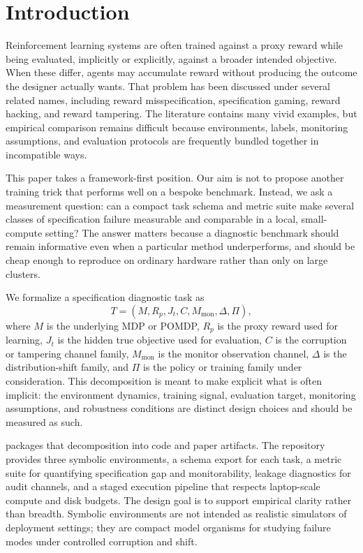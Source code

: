 \section{Introduction}
Reinforcement learning systems are often trained against a proxy reward while
being evaluated, implicitly or explicitly, against a broader intended
objective. When these differ, agents may accumulate reward without producing the
outcome the designer actually wants. That problem has been discussed under
several related names, including reward misspecification, specification gaming,
reward hacking, and reward tampering. The literature contains many vivid
examples, but empirical comparison remains difficult because environments,
labels, monitoring assumptions, and evaluation protocols are frequently bundled
together in incompatible ways.

This paper takes a framework-first position. Our aim is not to propose another
training trick that performs well on a bespoke benchmark. Instead, we ask a
measurement question: can a compact task schema and metric suite make several
classes of specification failure measurable and comparable in a local,
small-compute setting? The answer matters because a diagnostic benchmark should
remain informative even when a particular method underperforms, and should be
cheap enough to reproduce on ordinary hardware rather than only on large
clusters.

We formalize a specification diagnostic task as
\[
T = (M, R_p, J_t, C, M_{\mathrm{mon}}, \Delta, \Pi),
\]
where $M$ is the underlying MDP or POMDP, $R_p$ is the proxy reward used for
learning, $J_t$ is the hidden true objective used for evaluation, $C$ is the
corruption or tampering channel family, $M_{\mathrm{mon}}$ is the monitor
observation channel, $\Delta$ is the distribution-shift family, and $\Pi$ is
the policy or training family under consideration. This decomposition is meant
to make explicit what is often implicit: the environment dynamics, training
signal, evaluation target, monitoring assumptions, and robustness conditions are
distinct design choices and should be measured as such.

\framework packages that decomposition into code and paper artifacts. The
repository provides three symbolic environments, a schema export for each task,
a metric suite for quantifying specification gap and monitorability, leakage
diagnostics for audit channels, and a staged execution pipeline that respects
laptop-scale compute and disk budgets. The design goal is to support empirical
clarity rather than breadth. Symbolic environments are not intended as realistic
simulators of deployment settings; they are compact model organisms for studying
failure modes under controlled corruption and shift.

